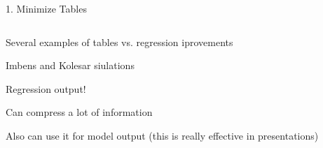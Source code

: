 \documentclass[notes,11pt, aspectratio=169]{beamer}
\newenvironment{wideitemize}{\itemize\addtolength{\itemsep}{10pt}}{\enditemize}
\begin{document}
\begin{frame}{1. Minimize Tables}
  \begin{columns}[T] %
    \begin{column}{.5\textwidth}
      \begin{wideitemize}
      \item<1-> Several examples of tables vs. regression iprovements
      \item<1-> Imbens and Kolesar siulations
      \item<2-> Regression output!
      \item<3-> Can compress a lot of information
      \item<4-> Also can use it for model output  (this is really effective in presentations)
      \end{wideitemize}
  \end{column}%
  \hfill%
  \begin{column}{.5\textwidth}
\end{column}
\end{columns}
\end{frame}
\end{document}
